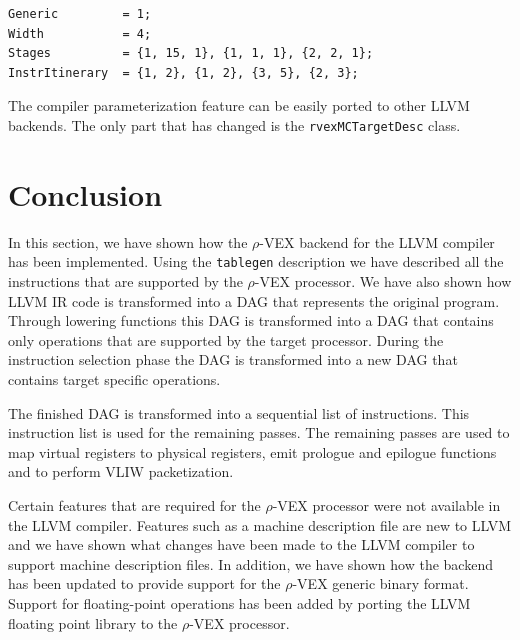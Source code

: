 \begin{lstlisting}[language=config]
Generic         = 1;
Width           = 4; 
Stages          = {1, 15, 1}, {1, 1, 1}, {2, 2, 1};
InstrItinerary  = {1, 2}, {1, 2}, {3, 5}, {2, 3};
\end{lstlisting}

The compiler parameterization feature can be easily ported to other LLVM backends. The only part that has changed is the \texttt{rvexMCTargetDesc} class. 

\section{Conclusion}
In this section, we have shown how the $\rho$-VEX backend for the LLVM compiler has been implemented. Using the \texttt{tablegen} description we have described all the instructions that are supported by the $\rho$-VEX processor. We have also shown how LLVM IR code is transformed into a DAG that represents the original program. Through lowering functions this DAG is transformed into a DAG that contains only operations that are supported by the target processor. During the instruction selection phase the DAG is transformed into a new DAG that contains target specific operations.

The finished DAG is transformed into a sequential list of instructions. This instruction list is used for the remaining passes. The remaining passes are used to map virtual registers to physical registers, emit prologue and epilogue functions and to perform VLIW packetization.

Certain features that are required for the $\rho$-VEX processor were not available in the LLVM compiler. Features such as a machine description file are new to LLVM and we have shown what changes have been made to the LLVM compiler to support machine description files. In addition, we have shown how the backend has been updated to provide support for the $\rho$-VEX generic binary format. Support for floating-point operations has been added by porting the LLVM floating point library to the $\rho$-VEX processor.


\acresetall


